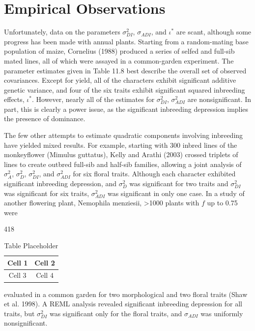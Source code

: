 \documentclass{article}
\begin{document}
\section{Empirical Observations}
Unfortunately, data on the parameters  $ \sigma_{DI}^{2} $,  $ \sigma_{ADI} $, and  $ \iota^{*} $ are scant, although some progress has been made with annual plants. Starting from a random-mating base population of maize, Cornelius (1988) produced a series of selfed and full-sib mated lines, all of which were assayed in a common-garden experiment. The parameter estimates given in Table 11.8 best describe the overall set of observed covariances. Except for yield, all of the characters exhibit significant additive genetic variance, and four of the six traits exhibit significant squared inbreeding effects,  $ \iota^{*} $. However, nearly all of the estimates for  $ \sigma_{DI}^{2} $,  $ \sigma_{ADI}^{2} $ are nonsignificant. In part, this is clearly a power issue, as the significant inbreeding depression implies the presence of dominance.

The few other attempts to estimate quadratic components involving inbreeding have yielded mixed results. For example, starting with 300 inbred lines of the monkeyflower (Mimulus guttatus), Kelly and Arathi (2003) crossed triplets of lines to create outbred full-sib and half-sib families, allowing a joint analysis of  $ \sigma_A^2 $,  $ \sigma_D^2 $,  $ \sigma_{DI}^2 $, and  $ \sigma_{ADI}^2 $ for six floral traits. Although each character exhibited significant inbreeding depression, and  $ \sigma_D^2 $ was significant for two traits and  $ \sigma_{DI}^2 $ was significant for six traits,  $ \sigma_{ADI}^2 $ was significant in only one case. In a study of another flowering plant, Nemophila menziesii, >1000 plants with  $ f $ up to 0.75 were

418

\begin{table}[h]
\centering
\begin{tabular}{|c|c|}
\hline
Cell 1 & Cell 2 \\
\hline
Cell 3 & Cell 4 \\
\hline
\end{tabular}
\caption{Table Placeholder}
\end{table}

evaluated in a common garden for two morphological and two floral traits (Shaw et al. 1998). A REML analysis revealed significant inbreeding depression for all traits, but  $ \sigma_{DI}^{2} $ was significant only for the floral traits, and  $ \sigma_{ADI} $ was uniformly nonsignificant.
\end{document}
